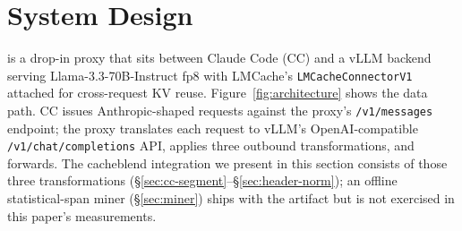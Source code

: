
\section{System Design}
\label{sec:system}

\sys{} is a drop-in proxy that sits between Claude Code (CC) and a vLLM
backend serving Llama-3.3-70B-Instruct fp8 with LMCache's
\texttt{LMCacheConnectorV1} attached for cross-request KV reuse.
Figure~\ref{fig:architecture} shows the data path. CC issues
Anthropic-shaped requests against the proxy's \texttt{/v1/messages}
endpoint; the proxy translates each request to vLLM's OpenAI-compatible
\texttt{/v1/chat/completions} API, applies three outbound
transformations, and forwards. The cacheblend integration we present
in this section consists of those three transformations
(\S\ref{sec:cc-segment}--\S\ref{sec:header-norm}); an offline
statistical-span miner (\S\ref{sec:miner}) ships with the artifact
but is not exercised in this paper's measurements.

